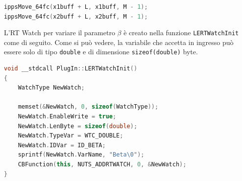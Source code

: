 \documentclass[12pt,a4paper,titlepage]{article}
\begin{document}
\begin{lstlisting}[language=cpp, label=code:aggiornamento_buffer_ingresso, caption = Aggiornamento dei buffer di ingresso, breaklines = false, captionpos = b]
ippsMove_64fc(x1buff + L, x1buff, M - 1);
ippsMove_64fc(x2buff + L, x2buff, M - 1);
\end{lstlisting}
L'RT Watch per variare il parametro $\beta$ è creato nella funzione \texttt{LERTWatchInit} come di seguito. Come si può vedere, la variabile che accetta in ingresso può essere solo di tipo \texttt{double} e di dimensione \texttt{sizeof(double)} byte.

\begin{lstlisting}[language=cpp, label=code:rtwatch_fd, caption = Creazione RT Watch, breaklines = false, captionpos = b]
void __stdcall PlugIn::LERTWatchInit()
{
	WatchType NewWatch;

	memset(&NewWatch, 0, sizeof(WatchType));
	NewWatch.EnableWrite = true;
	NewWatch.LenByte = sizeof(double);
	NewWatch.TypeVar = WTC_DOUBLE;
	NewWatch.IDVar = ID_BETA;
	sprintf(NewWatch.VarName, "Beta\0");
	CBFunction(this, NUTS_ADDRTWATCH, 0, &NewWatch);
}
\end{lstlisting}
\clearpage

\nocite{*}
\printbibliography
\end{document}
